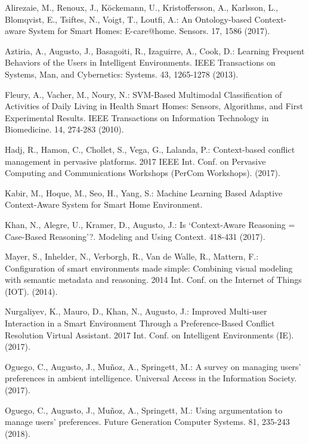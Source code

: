 \documentclass{llncs}
\begin{document}
    \begin{thebibliography}{1}
        Alirezaie, M., Renoux, J., Köckemann, U., Kristoffersson, A., Karlsson, L., Blomqvist, E., Tsiftes, N., Voigt, T., Loutfi, A.: An Ontology-based Context-aware System for Smart Homes: E-care@home. Sensors. 17, 1586 (2017).

        Aztiria, A., Augusto, J., Basagoiti, R., Izaguirre, A., Cook, D.: Learning Frequent Behaviors of the Users in Intelligent Environments. IEEE Transactions on Systems, Man, and Cybernetics: Systems. 43, 1265-1278 (2013).

        Fleury, A., Vacher, M., Noury, N.: SVM-Based Multimodal Classification of Activities of Daily Living in Health Smart Homes: Sensors, Algorithms, and First Experimental Results. IEEE Transactions on Information Technology in Biomedicine. 14, 274-283 (2010).

        Hadj, R., Hamon, C., Chollet, S., Vega, G., Lalanda, P.: Context-based conflict management in pervasive platforms. 2017 IEEE Int. Conf. on Pervasive Computing and Communications Workshops (PerCom Workshops). (2017).

        Kabir, M., Hoque, M., Seo, H., Yang, S.: Machine Learning Based Adaptive Context-Aware System for Smart Home Environment.

        Khan, N., Alegre, U., Kramer, D., Augusto, J.: Is ‘Context-Aware Reasoning = Case-Based Reasoning’?. Modeling and Using Context. 418-431 (2017).

        Mayer, S., Inhelder, N., Verborgh, R., Van de Walle, R., Mattern, F.: Configuration of smart environments made simple: Combining visual modeling with semantic metadata and reasoning. 2014 Int. Conf. on the Internet of Things (IOT). (2014).

        Nurgaliyev, K., Mauro, D., Khan, N., Augusto, J.: Improved Multi-user Interaction in a Smart Environment Through a Preference-Based Conflict Resolution Virtual Assistant. 2017 Int. Conf. on Intelligent Environments (IE). (2017).

        Oguego, C., Augusto, J., Muñoz, A., Springett, M.: A survey on managing users’ preferences in ambient intelligence. Universal Access in the Information Society. (2017).

        Oguego, C., Augusto, J., Muñoz, A., Springett, M.: Using argumentation to manage users’ preferences. Future Generation Computer Systems. 81, 235-243 (2018).


\end{thebibliography}
\end{document}
